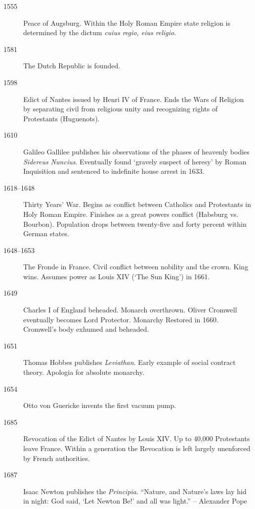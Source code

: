 \documentclass[11pt]{article}
\begin{document}
\begin{description}
\item[1555]  Peace of Augsburg.  Within the Holy Roman Empire state religion is determined by the dictum \textit{cuius regio, eius religio}. 

\item[1581]  The Dutch Republic is founded.

\item[1598]  Edict of Nantes issued by Henri IV of France.  Ends the Wars of Religion by separating civil from religious unity and recognizing rights of Protestants (Huguenots).

\item[1610]  Galileo Gallilee publishes his observations of the phases of heavenly bodies \textit{Sidereus Nuncius}.  Eventually found `gravely suspect of heresy' by Roman Inquisition and sentenced to indefinite house arrest in 1633.

\item[1618--1648]  Thirty Years' War.  Begins as conflict between Catholics and Protestants in Holy Roman Empire.  Finishes as a great powers conflict (Habsburg vs. Bourbon).  Population drops between twenty-five and forty percent within German states.

\item[1648--1653]  The Fronde in France.  Civil conflict between nobility and the crown.  King wins.  Assumes power as Louis XIV (`The Sun King') in 1661.

\item[1649]  Charles I of England beheaded.  Monarch overthrown.  Oliver Cromwell eventually becomes Lord Protector.  Monarchy Restored in 1660.  Cromwell's body exhumed and beheaded.  

\item[1651]  Thomas Hobbes publishes \textit{Leviathan}.  Early example of social contract theory.  Apologia for absolute monarchy.

\item[1654]  Otto von Guericke invents the first vacuum pump.

\item[1685]  Revocation of the Edict of Nantes by Louis XIV.  Up to 40,000 Protestants leave France.  Within a generation the Revocation is left largely unenforced by French authorities.

\item[1687]  Isaac Newton publishes the \textit{Principia}.  ``Nature, and Nature's laws lay hid in night:  God said, `Let Newton Be!' and all was light.'' -- Alexander Pope


\end{description}
\end{document}

